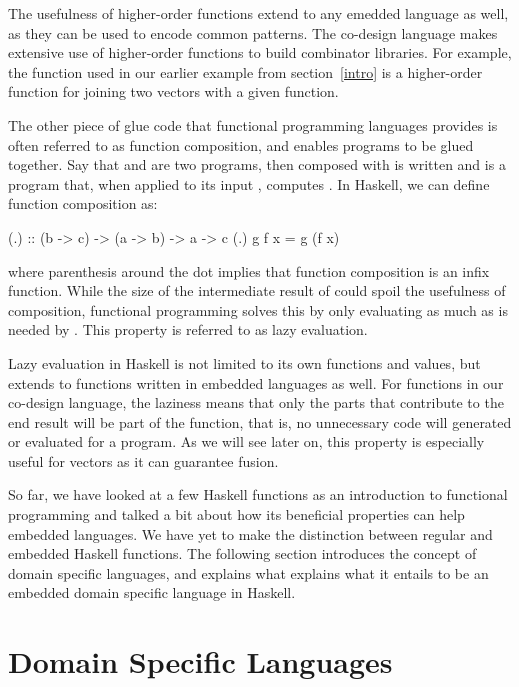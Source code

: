\documentclass[../main.tex]{subfiles}
\begin{document}
The usefulness of higher-order functions extend to any emedded language as well, as they can be used to encode common patterns. The co-design language makes extensive use of higher-order functions to build combinator libraries. For example, the  function used in our earlier  example from section~\ref{intro} is a higher-order function for joining two vectors with a given function.

The other piece of glue code that functional programming languages provides is often referred to as function composition, and enables programs to be glued together. Say that  and  are two programs, then  composed with  is written  and is a program that, when applied to its input , computes . In Haskell, we can define function composition as:

\begin{code}
(.) :: (b -> c) -> (a -> b) -> a -> c
(.) g f x = g (f x)
\end{code}

\noindent where parenthesis around the dot implies that function composition is an infix function. While the size of the intermediate result of  could spoil the usefulness of composition, functional programming solves this by only evaluating  as much as is needed by . This property is referred to as lazy evaluation.

Lazy evaluation in Haskell is not limited to its own functions and values, but extends to functions written in embedded languages as well. For functions in our co-design language, the laziness means that only the parts that contribute to the end result will be part of the function, that is, no unnecessary code will generated or evaluated for a program. As we will see later on, this property is especially useful for vectors as it can guarantee fusion.

So far, we have looked at a few Haskell functions as an introduction to functional programming and talked a bit about how its beneficial properties can help embedded languages. We have yet to make the distinction between regular and embedded Haskell functions. The following section introduces the concept of domain specific languages, and explains what explains what it entails to be an embedded domain specific language in Haskell.

\section{Domain Specific Languages}
\label{domain}
\end{document}
